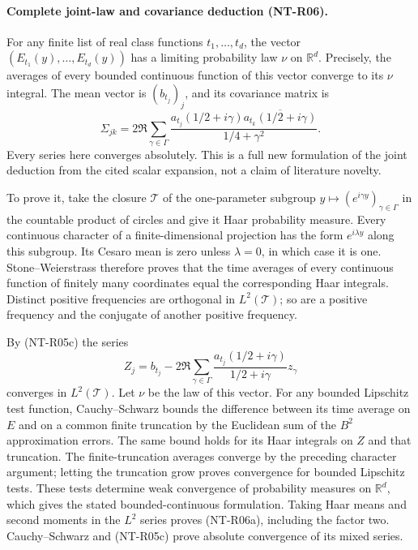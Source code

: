 \paragraph{Complete joint-law and covariance deduction (NT-R06).}
For any finite list of real class functions $t_1,\ldots,t_d$, the
vector $(E_{t_1}(y),\ldots,E_{t_d}(y))$ has a limiting probability
law $\nu$ on $\mathbb R^d$. Precisely, the averages of every bounded
continuous function of this vector converge to its $\nu$ integral.
The mean vector is $(b_{t_j})_j$, and its covariance matrix is
\[
 \Sigma_{jk}=2\Re\sum_{\gamma\in\Gamma}
       \frac{a_{t_j}(1/2+i\gamma)
             \overline{a_{t_k}(1/2+i\gamma)}}{1/4+\gamma^2}.
 \tag{NT-R06a}
\]
Every series here converges absolutely. This is a full new
formulation of the joint deduction from the cited scalar expansion,
not a claim of literature novelty.

To prove it, take the closure $\mathcal T$ of the one-parameter
subgroup
$y\mapsto(e^{i\gamma y})_{\gamma\in\Gamma}$ in the countable
product of circles and give it Haar probability measure. Every
continuous character of a finite-dimensional projection has the
form $e^{i\lambda y}$ along this subgroup. Its Cesaro mean is zero
unless $\lambda=0$, in which case it is one. Stone--Weierstrass
therefore proves that the time averages of every continuous
function of finitely many coordinates equal the corresponding
Haar integrals. Distinct positive frequencies are orthogonal in
$L^2(\mathcal T)$; so are a positive frequency and the conjugate of
another positive frequency.

By (NT-R05c) the series
\[
 Z_j=b_{t_j}-2\Re\sum_{\gamma\in\Gamma}
       \frac{a_{t_j}(1/2+i\gamma)}{1/2+i\gamma}z_\gamma
\]
converges in $L^2(\mathcal T)$. Let $\nu$ be the law of this vector.
For any bounded Lipschitz test function, Cauchy--Schwarz bounds the
difference between its time average on $E$ and on a common finite
truncation by the Euclidean sum of the $B^2$ approximation errors.
The same bound holds for its Haar integrals on $Z$ and that
truncation. The finite-truncation averages converge by the preceding
character argument; letting the truncation grow proves convergence
for bounded Lipschitz tests. These tests determine weak convergence
of probability measures on $\mathbb R^d$, which gives the stated
bounded-continuous formulation. Taking Haar means and second moments
in the $L^2$ series proves (NT-R06a), including the factor two.
Cauchy--Schwarz and (NT-R05c) prove absolute convergence of its
mixed series.

